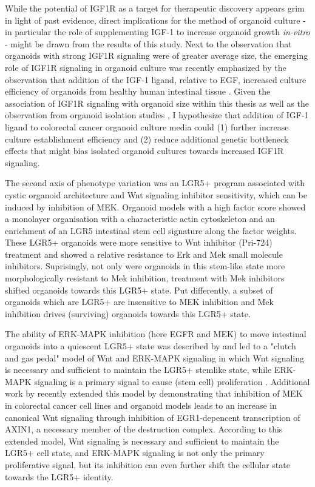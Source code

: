 \begin{flushleft}
While the potential of IGF1R as a target for therapeutic discovery appears grim in light of past evidence, direct implications for the method of organoid culture - in particular the role of supplementing IGF-1 to increase organoid growth \textit{in-vitro} - might be drawn from the results of this study. Next to the observation that organoids with strong IGF1R signaling were of greater average size, the emerging role of IGF1R signaling in organoid culture was recently emphasized by the observation that addition of the IGF-1 ligand, relative to EGF, increased culture efficiency of organoids from healthy human intestinal tissue \parencite{fujiiHumanIntestinalOrganoids2018a}. Given the association of IGF1R signaling with organoid size within this thesis as well as the observation from organoid isolation studies \parencite{fujiiHumanIntestinalOrganoids2018a}, I hypothesize that addition of IGF-1 ligand to colorectal cancer organoid culture media could (1) further increase culture establishment efficiency and (2) reduce additional genetic bottleneck effects that might bias isolated organoid cultures towards increased IGF1R signaling.
\smallbreak

The second axis of phenotype variation was an LGR5+ program associated with cystic organoid architecture and Wnt signaling inhibitor sensitivity, which can be induced by inhibition of MEK. Organoid models with a high factor score showed a monolayer organisation with a characteristic actin cytoskeleton and an enrichment of an LGR5 intestinal stem cell signature along the factor weights. These LGR5+ organoids were more sensitive to Wnt inhibitor (Pri-724) treatment and showed a relative resistance to Erk and Mek small molecule inhibitors. Suprisingly, not only were organoids in this stem-like state more morphologically resistant to Mek inhibition, treatment with Mek inhibitors shifted organoids towards this LGR5+ state. Put differently, a subset of organoids which are LGR5+ are insensitive to MEK inhibition and Mek inhibition drives (surviving) organoids towards this LGR5+ state.
\par

The ability of ERK-MAPK inhibition (here EGFR and MEK) to move intestinal organoids into a quiescent LGR5+ state was described by \parencite{basakInducedQuiescenceLgr52017} and led to a "clutch and gas pedal" model of Wnt and ERK-MAPK signaling in which Wnt signaling is necessary and sufficient to maintain the LGR5+ stemlike state, while ERK-MAPK signaling is a primary signal to cause (stem cell) proliferation \parencite{basakInducedQuiescenceLgr52017}. Additional work by \parencite{zhanMEKInhibitorsActivate2019a} recently extended this model by demonstrating that inhibition of MEK in colorectal cancer cell lines and organoid models leads to an increase in canonical Wnt signaling through inhibition of EGR1-depencent transcription of AXIN1, a necessary member of the destruction complex. According to this extended model, Wnt signaling is necessary and sufficient to maintain the LGR5+ cell state, and ERK-MAPK signaling is not only the primary proliferative signal, but its inhibition can even further shift the cellular state towards the LGR5+ identity. 



\end{flushleft}
